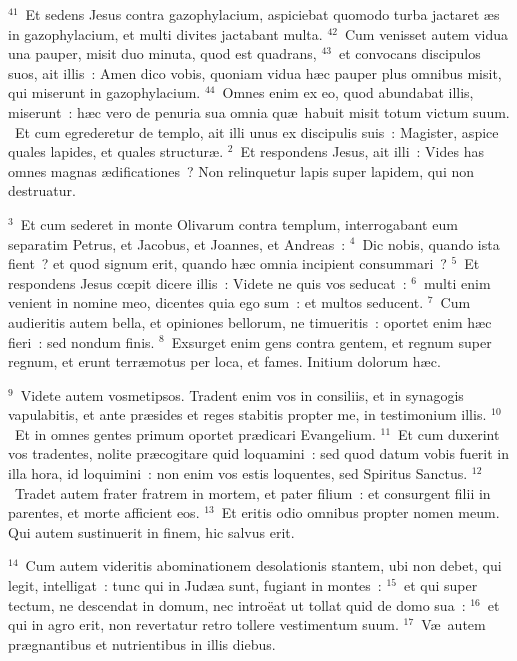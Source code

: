 ${}^{41}$~Et sedens Jesus contra gazophylacium, aspiciebat quomodo turba jactaret \ae s in gazophylacium, et multi divites jactabant multa.
${}^{42}$~Cum venisset autem vidua una pauper, misit duo minuta, quod est quadrans,
${}^{43}$~et convocans discipulos suos, ait illis~: Amen dico vobis, quoniam vidua h\ae c pauper plus omnibus misit, qui miserunt in gazophylacium.
${}^{44}$~Omnes enim ex eo, quod abundabat illis, miserunt~: h\ae c vero de penuria sua omnia qu\ae\ habuit misit totum victum suum.
~Et cum egrederetur de templo, ait illi unus ex discipulis suis~: Magister, aspice quales lapides, et quales structur\ae .
${}^{2}$~Et respondens Jesus, ait illi~: Vides has omnes magnas \ae dificationes~? Non relinquetur lapis super lapidem, qui non destruatur.


${}^{3}$~Et cum sederet in monte Olivarum contra templum, interrogabant eum separatim Petrus, et Jacobus, et Joannes, et Andreas~:
${}^{4}$~Dic nobis, quando ista fient~? et quod signum erit, quando h\ae c omnia incipient consummari~?
${}^{5}$~Et respondens Jesus cœpit dicere illis~: Videte ne quis vos seducat~:
${}^{6}$~multi enim venient in nomine meo, dicentes quia ego sum~: et multos seducent.
${}^{7}$~Cum audieritis autem bella, et opiniones bellorum, ne timueritis~: oportet enim h\ae c fieri~: sed nondum finis.
${}^{8}$~Exsurget enim gens contra gentem, et regnum super regnum, et erunt terr\ae motus per loca, et fames. Initium dolorum h\ae c.


${}^{9}$~Videte autem vosmetipsos. Tradent enim vos in consiliis, et in synagogis vapulabitis, et ante pr\ae sides et reges stabitis propter me, in testimonium illis.
${}^{10}$~Et in omnes gentes primum oportet pr\ae dicari Evangelium.
${}^{11}$~Et cum duxerint vos tradentes, nolite pr\ae cogitare quid loquamini~: sed quod datum vobis fuerit in illa hora, id loquimini~: non enim vos estis loquentes, sed Spiritus Sanctus.
${}^{12}$~Tradet autem frater fratrem in mortem, et pater filium~: et consurgent filii in parentes, et morte afficient eos.
${}^{13}$~Et eritis odio omnibus propter nomen meum. Qui autem sustinuerit in finem, hic salvus erit.


${}^{14}$~Cum autem videritis abominationem desolationis stantem, ubi non debet, qui legit, intelligat~: tunc qui in Jud\ae a sunt, fugiant in montes~:
${}^{15}$~et qui super tectum, ne descendat in domum, nec intro\"eat ut tollat quid de domo sua~:
${}^{16}$~et qui in agro erit, non revertatur retro tollere vestimentum suum.
${}^{17}$~V\ae\ autem pr\ae gnantibus et nutrientibus in illis diebus.


